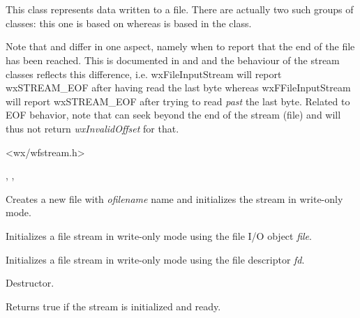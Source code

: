 \section{}\label{wxfileoutputstream}

This class represents data written to a file. There are actually
two such groups of classes: this one is based on  
whereas  is based in
the  class.

Note that  and  differ
in one aspect, namely when to report that the end of the file has been
reached. This is documented in  and 
 and the behaviour of the stream
classes reflects this difference, i.e. wxFileInputStream will report
wxSTREAM\_EOF after having read the last byte whereas wxFFileInputStream
will report wxSTREAM\_EOF after trying to read {\it past} the last byte.
Related to EOF behavior, note that  
can seek beyond the end of the stream (file) and will thus not return 
{\it wxInvalidOffset} for that.




<wx/wfstream.h>


, , 




Creates a new file with {\it ofilename} name and initializes the stream in
write-only mode. 


Initializes a file stream in write-only mode using the file I/O object {\it file}.


Initializes a file stream in write-only mode using the file descriptor {\it fd}.



Destructor.



Returns true if the stream is initialized and ready.

